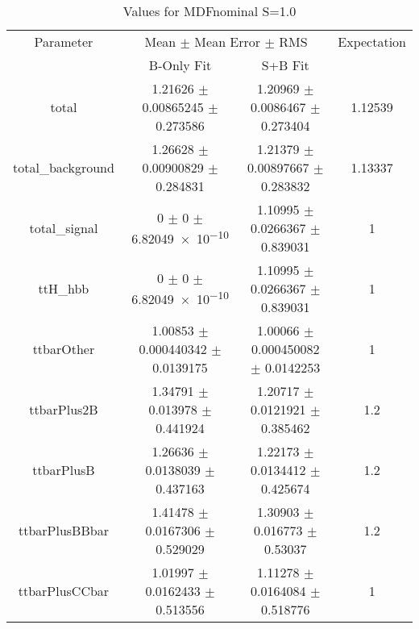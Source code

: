 \begin{table}
\centering
\caption{Values for MDFnominal S=1.0}
\begin{tabular}{cccc}
\toprule
Parameter & \multicolumn{2}{c}{Mean $\pm$ Mean Error $\pm$ RMS} & Expectation\\
 & B-Only Fit & S+B Fit & \\
\midrule
total & \num{1.21626} $\pm$ \num{0.00865245} $\pm$ \num{0.273586} & \num{1.20969} $\pm$ \num{0.0086467} $\pm$ \num{0.273404} & \num{1.12539}\\
total\_background & \num{1.26628} $\pm$ \num{0.00900829} $\pm$ \num{0.284831} & \num{1.21379} $\pm$ \num{0.00897667} $\pm$ \num{0.283832} & \num{1.13337}\\
total\_signal & \num{0} $\pm$ \num{0} $\pm$ \num{6.82049e-10} & \num{1.10995} $\pm$ \num{0.0266367} $\pm$ \num{0.839031} & \num{1}\\
ttH\_hbb & \num{0} $\pm$ \num{0} $\pm$ \num{6.82049e-10} & \num{1.10995} $\pm$ \num{0.0266367} $\pm$ \num{0.839031} & \num{1}\\
ttbarOther & \num{1.00853} $\pm$ \num{0.000440342} $\pm$ \num{0.0139175} & \num{1.00066} $\pm$ \num{0.000450082} $\pm$ \num{0.0142253} & \num{1}\\
ttbarPlus2B & \num{1.34791} $\pm$ \num{0.013978} $\pm$ \num{0.441924} & \num{1.20717} $\pm$ \num{0.0121921} $\pm$ \num{0.385462} & \num{1.2}\\
ttbarPlusB & \num{1.26636} $\pm$ \num{0.0138039} $\pm$ \num{0.437163} & \num{1.22173} $\pm$ \num{0.0134412} $\pm$ \num{0.425674} & \num{1.2}\\
ttbarPlusBBbar & \num{1.41478} $\pm$ \num{0.0167306} $\pm$ \num{0.529029} & \num{1.30903} $\pm$ \num{0.016773} $\pm$ \num{0.53037} & \num{1.2}\\
ttbarPlusCCbar & \num{1.01997} $\pm$ \num{0.0162433} $\pm$ \num{0.513556} & \num{1.11278} $\pm$ \num{0.0164084} $\pm$ \num{0.518776} & \num{1}\\
\bottomrule
\end{tabular}
\end{table}